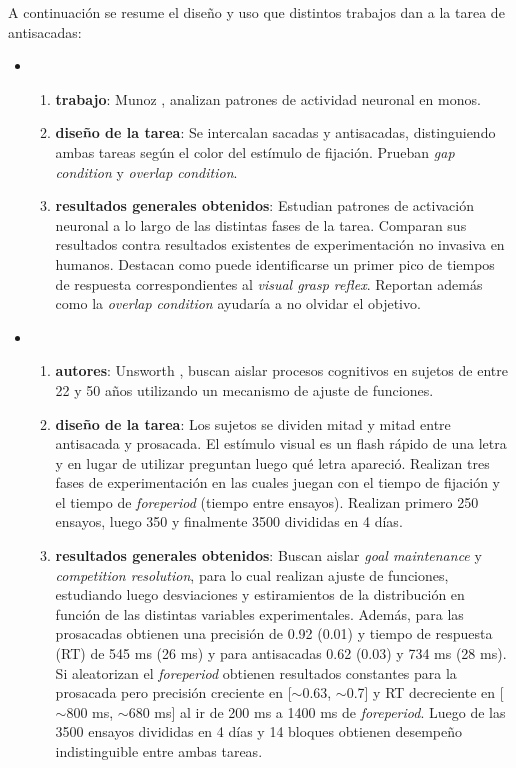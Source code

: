 A continuación se resume el diseño y uso que distintos trabajos dan a la tarea
de antisacadas:
\begin{itemize}

  \item \begin{enumerate}
    \item \textbf{trabajo}:
      Munoz \etal \cite{munoz_2004_look_away}, analizan patrones de actividad
      neuronal en monos.
    \item \textbf{diseño de la tarea}:
      Se intercalan sacadas y antisacadas, distinguiendo ambas tareas según el
      color del estímulo de fijación.
      Prueban \textit{gap condition} y \textit{overlap condition}.
    \item \textbf{resultados generales obtenidos}:
      Estudian patrones de activación neuronal a lo largo de las distintas
      fases de la tarea.
      Comparan sus resultados contra resultados existentes de experimentación
      no invasiva en humanos.
      Destacan como puede identificarse un primer pico de tiempos de respuesta
      correspondientes al \textit{visual grasp reflex}.
      Reportan además como la \textit{overlap condition} ayudaría a no
      olvidar el objetivo.
  \end{enumerate}

  \item \begin{enumerate}
    \item \textbf{autores}:
      Unsworth \etal \cite{unsworth_2011_distribution_analysis}, buscan
      aislar procesos cognitivos en sujetos de entre 22 y 50 años utilizando un
      mecanismo de ajuste de funciones.
    \item \textbf{diseño de la tarea}:
      Los sujetos se dividen mitad y mitad entre antisacada y prosacada.
      El estímulo visual es un flash rápido de una letra y en lugar de utilizar
      \eyetracking preguntan luego qué letra apareció.
      Realizan tres fases de experimentación en las cuales juegan con el tiempo
      de fijación y el tiempo de \textit{foreperiod} (tiempo entre ensayos).
      Realizan primero 250 ensayos, luego 350 y finalmente 3500 divididas en 4
      días.
    \item \textbf{resultados generales obtenidos}:
      Buscan aislar \textit{goal maintenance} y \textit{competition
      resolution}, para lo cual realizan ajuste de funciones, estudiando luego
      desviaciones y estiramientos de la distribución en función de las
      distintas variables experimentales.
      Además, para las prosacadas obtienen una precisión de 0.92 (0.01) y
      tiempo de respuesta (RT) de 545 ms (26 ms) y para antisacadas 0.62 (0.03)
      y 734 ms (28 ms).
      Si aleatorizan el \textit{foreperiod} obtienen resultados constantes
      para la prosacada pero precisión creciente en [$\sim$0.63, $\sim$0.7] y
      RT decreciente en [$\sim$800 ms, $\sim$680 ms] al ir de 200 ms a 1400 ms
      de \textit{foreperiod}.
      Luego de las 3500 ensayos divididas en 4 días y 14 bloques obtienen
      desempeño indistinguible entre ambas tareas.
  \end{enumerate}


\end{itemize}
